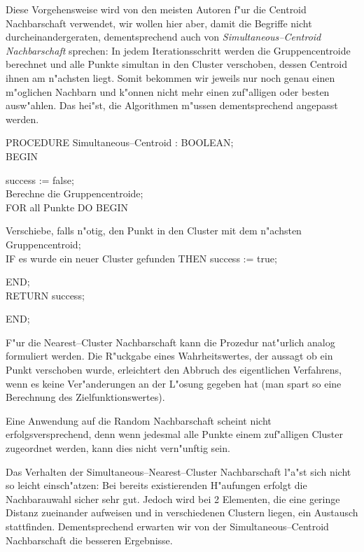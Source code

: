 Diese Vorgehensweise wird von den meisten Autoren f"ur die
Centroid Nachbarschaft verwendet, wir wollen hier aber, damit die 
Begriffe nicht durcheinandergeraten, dementsprechend auch von
{\em Simultaneous--Centroid Nachbarschaft} sprechen:
In jedem Iterationsschritt werden die Gruppencentroide berechnet und alle
Punkte simultan in den Cluster verschoben, dessen Centroid ihnen am 
n"achsten liegt. Somit bekommen wir jeweils nur noch genau einen 
m"oglichen Nachbarn und k"onnen nicht mehr einen zuf"alligen oder
besten ausw"ahlen. Das hei"st, die Algorithmen m"ussen dementsprechend
angepasst werden.

\begin{algorithm*}
PROCEDURE Simultaneous--Centroid : BOOLEAN;\\
BEGIN
\begin{Block}
	success := false;\\
	Berechne die Gruppencentroide;\\
	FOR all Punkte DO BEGIN
	\begin{Block}
		Verschiebe, falls n"otig, den Punkt in den Cluster mit
		dem n"achsten Gruppencentroid;\\
		IF es wurde ein neuer Cluster gefunden THEN success := true;
	\end{Block}
	END;\\
	RETURN success;
\end{Block}
END;
\end{algorithm*}

F"ur die Nearest--Cluster Nachbarschaft kann die Prozedur nat"urlich
analog formuliert werden. Die R"uckgabe eines Wahrheitswertes, der 
aussagt ob ein Punkt verschoben wurde, erleichtert den Abbruch des
eigentlichen Verfahrens, wenn es keine Ver"anderungen an der L"osung
gegeben hat (man spart so eine Berechnung des Zielfunktionswertes).

Eine Anwendung auf die Random Nachbarschaft scheint nicht erfolgsversprechend, 
denn wenn jedesmal alle Punkte einem zuf"alligen Cluster zugeordnet 
werden, kann dies nicht vern"unftig sein.

Das Verhalten der Simultaneous--Nearest--Cluster Nachbarschaft l"a"st sich
nicht so leicht einsch"atzen: Bei bereits existierenden H"aufungen erfolgt
die Nachbarauwahl sicher sehr gut. Jedoch wird bei 2 Elementen, die eine
geringe Distanz zueinander aufweisen und in verschiedenen Clustern liegen, 
ein Austausch stattfinden. Dementsprechend erwarten wir von der 
Simultaneous--Centroid Nachbarschaft die besseren Ergebnisse.

